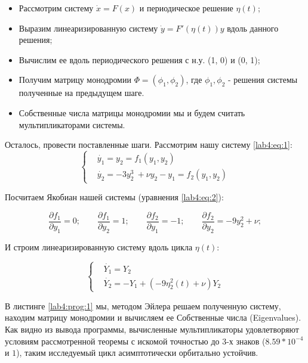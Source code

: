 \begin{itemize}
    \item Рассмотрим систему $\dot{x} = F(x)$ и периодическое решение $\eta(t)$;
    \item Выразим линеаризированную систему $\dot{y} = F'(\eta(t))y$ вдоль
    данного решения;
    \item Вычислим ее вдоль периодического решения с н.у. (1, 0) и (0, 1);
    \item Получим матрицу монодромии $\Phi = (\phi_1, \phi_2)$, где $\phi_1, \phi_2$ -
    решения системы полученные на предыдущем шаге.
    \item Собственные числа матрицы монодромии мы и будем считать мультипликаторами
    системы.
\end{itemize}

Осталось, провести поставленные шаги. Рассмотрим нашу систему \ref{lab4:eq:1}:
\begin{equation}\label{lab4:eq:1}
    \begin{cases}
        &\dot{y_1} = y_2 = f_1(y_1, y_2) \\
        &\dot{y_2} = -3y_2^3\ + \nu y_2 - y_1 = f_2(y_1, y_2)
    \end{cases}
\end{equation}

Посчитаем Якобиан нашей системы (уравнения \ref{lab4:eq:2}):

\begin{equation}\label{lab4:eq:2}
    \frac{\partial f_1}{\partial y_1} = 0;\qquad
    \frac{\partial f_1}{\partial y_2} = 1;\qquad
    \frac{\partial f_2}{\partial y_1} = -1;\qquad
    \frac{\partial f_2}{\partial y_2} = -9y_2^2 + \nu;
\end{equation}

И строим линеаризированную систему вдоль цикла $\eta(t)$:

\begin{equation}\label{lab4:eq:3}
    \begin{cases}
        &\dot{Y_1} = Y_2 \\
        &\dot{Y_2} = -Y_1 + (-9\eta_2^2(t) + \nu)Y_2
    \end{cases}
\end{equation}

В листинге \ref{lab4:prog:1} мы, методом Эйлера решаем полученную систему,
находим матрицу монодромии и вычисляем ее Собственные числа (Eigenvalues).
Как видно из вывода программы, вычисленные мультипликаторы удовлетворяют
условиям рассмотренной теоремы с искомой точностью до 3-х знаков
($8.59 * 10^{-4}$ и $1$), таким исследуемый цикл асимптотически орбитально устойчив.

